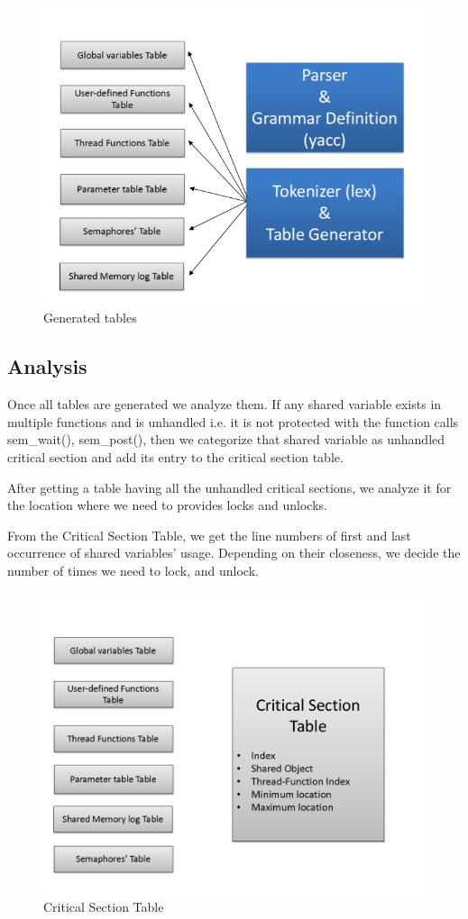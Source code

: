 \begin{figure}[h]
\centering
\includegraphics[scale=0.6]{tables.png}
\caption{Generated tables}
\label{<<label>>}
\end{figure}

\newpage
\subsection{Analysis}
Once all tables are generated we analyze them. If any shared variable exists in multiple functions and is unhandled i.e. it is not protected with the function calls sem\_wait(), sem\_post(), then we categorize that shared variable as unhandled critical section and add its entry to the critical section table.

After getting a table having all the unhandled critical sections, we analyze it for the location where we need to provides locks and unlocks. 

From the Critical Section Table, we get the line numbers of first and last occurrence of shared variables’ usage. Depending on their closeness, we decide the number of times we need to lock, and unlock.
\begin{figure}[h]
\centering
\includegraphics[scale=0.6]{cs.png}
\caption{Critical Section Table}
\label{<<label>>}
\end{figure}


